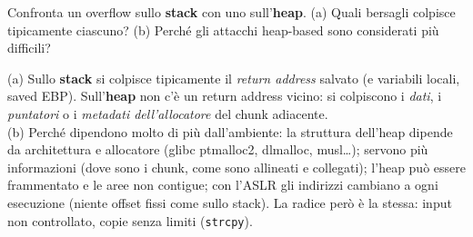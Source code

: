 \question[6]
Confronta un overflow sullo \textbf{stack} con uno sull'\textbf{heap}. (a) Quali bersagli colpisce tipicamente ciascuno? (b) Perché gli attacchi heap-based sono considerati più difficili?
\begin{solution}
(a) Sullo \textbf{stack} si colpisce tipicamente il \emph{return address} salvato (e variabili locali, saved EBP). Sull'\textbf{heap} non c'è un return address vicino: si colpiscono i \emph{dati}, i \emph{puntatori} o i \emph{metadati dell'allocatore} del chunk adiacente.\\
(b) Perché dipendono molto di più dall'ambiente: la struttura dell'heap dipende da architettura e allocatore (glibc ptmalloc2, dlmalloc, musl\dots); servono più informazioni (dove sono i chunk, come sono allineati e collegati); l'heap può essere frammentato e le aree non contigue; con l'ASLR gli indirizzi cambiano a ogni esecuzione (niente offset fissi come sullo stack). La radice però è la stessa: input non controllato, copie senza limiti (\lstinline|strcpy|).
\end{solution}
